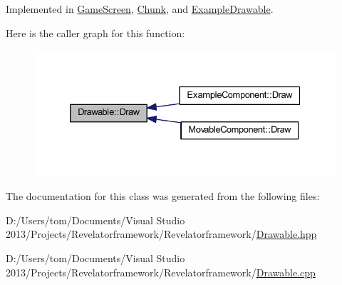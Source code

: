 Implemented in \hyperlink{class_game_screen_afb11360ac509f47ca47929c254a8b67d}{Game\-Screen}, \hyperlink{class_chunk_a3203da1471b5572e0dd2cd82e6dceb42}{Chunk}, and \hyperlink{class_example_drawable_a02efe170a267616262e1bac3d65cdf59}{Example\-Drawable}.



Here is the caller graph for this function\-:\nopagebreak
\begin{figure}[H]
\begin{center}
\leavevmode
\includegraphics[width=332pt]{class_drawable_a0e24de52eeb44555872c70f3adf854d2_icgraph}
\end{center}
\end{figure}




The documentation for this class was generated from the following files\-:\begin{DoxyCompactItemize}
\item 
D\-:/\-Users/tom/\-Documents/\-Visual Studio 2013/\-Projects/\-Revelatorframework/\-Revelatorframework/\hyperlink{_drawable_8hpp}{Drawable.\-hpp}\item 
D\-:/\-Users/tom/\-Documents/\-Visual Studio 2013/\-Projects/\-Revelatorframework/\-Revelatorframework/\hyperlink{_drawable_8cpp}{Drawable.\-cpp}\end{DoxyCompactItemize}
